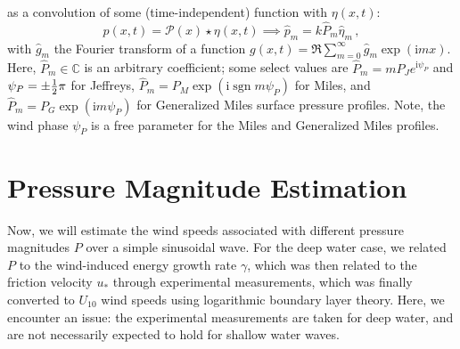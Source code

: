 \documentclass{jfm}
\let\Oldsection\section
\renewcommand{\section}{\FloatBarrier\Oldsection}
\newcommand{\GenP}{\hat{P}_m}
\DeclareMathOperator{\sgn}{sgn}
\newcommand{\im}{\mathrm{i}}
\begin{document}
as a convolution of some (time-independent) function with $\eta(x,t)$:
\begin{equation}
  p(x,t) = \mathcal{P}(x) \star \eta(x,t) \implies \hat{p}_m = k \GenP
    \hat{\eta}_m \,,
\end{equation}
with $\hat{g}_m$ the Fourier transform of a function $g(x,t) =
\Re{\sum_{m=0}^{\infty} \hat{g}_m \exp(\im m x)}$.
Here, $\GenP \in \mathbb{C}$ is an arbitrary coefficient; some select
values are
$\GenP = m P_J e^{\im \psi_P}$ and $\psi_P = \pm {\textstyle\frac{1}{2}} \pi$
for Jeffreys, $\GenP = P_M \exp(\im \sgn{m} \psi_P)$ for Miles, and
$\GenP = P_G \exp(\im m \psi_P)$ for Generalized Miles surface pressure
profiles.
Note, the wind phase $\psi_P$ is a free parameter for the Miles and
Generalized Miles profiles.

\section{Pressure Magnitude Estimation}
Now, we will estimate the wind speeds associated with different pressure
magnitudes $P$ over a simple sinusoidal wave.
For the deep water case, we related $P$ to the wind-induced energy growth
rate $\gamma$, which was then related to the friction velocity $u_*$
through experimental measurements, which was finally converted to
$U_{10}$ wind speeds using logarithmic boundary layer theory.
Here, we encounter an issue: the experimental measurements are taken for
deep water, and are not necessarily expected to hold for shallow water
waves.
\end{document}
